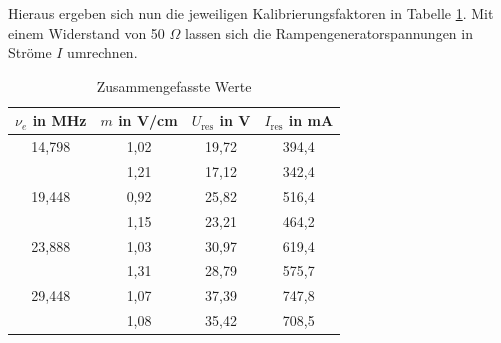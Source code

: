  \noindent Hieraus ergeben sich nun die jeweiligen Kalibrierungsfaktoren in Tabelle \ref{tab_xAxisKalibTOTAL}. Mit einem Widerstand von 50 $\Omega$ lassen sich
die Rampengeneratorspannungen in Ströme $I$ umrechnen.
\begin{table}[H]
 \begin{tabular}{c|c|c|c}
  $\nu_e$ in MHz & $m$ in V/cm & $U_\text{res}$ in V & $I_\text{res}$ in mA\\
  \hline
  14,798 & 1,02 & 19,72 & 394,4 \\
  & 1,21&17,12 & 342,4\\
  19,448&0,92 &25,82 & 516,4\\
  &1,15&23,21& 464,2\\
  23,888&1,03&30,97& 619,4\\
  &1,31&28,79&575,7\\
  29,448&1,07&37,39&747,8\\
  &1,08&35,42&708,5\\
 \end{tabular}
\caption{Zusammengefasste Werte}
\label{tab_xAxisKalibTOTAL}
\end{table}

